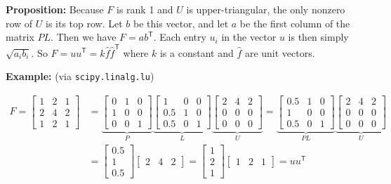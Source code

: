 \documentclass{article}
\begin{document}
\begin{enumerate}[label=(\roman*)]
\textbf{Proposition:} Because $F$ is rank 1 and $U$ is upper-triangular, the only nonzero row of $U$ is its top row. Let $b$ be this vector, and let $a$ be the first column of the matrix $PL$. Then we have $F = ab^\mathsf{T}$. Each entry $u_i$ in the vector $u$ is then simply $\sqrt{a_i b_i}$. So $F=uu^\mathsf{T}= k\hat{f}\hat{f}^\mathsf{T}$ where $k$ is a constant and $\hat{f}$ are unit vectors.

\textbf{Example:} (via \texttt{scipy.linalg.lu})

\begin{equation}
\begin{aligned}
F =
\begin{bmatrix}
1 & 2 & 1 \\
2 & 4 & 2 \\
1 & 2 & 1
\end{bmatrix}
&= 
\underbrace{\begin{bmatrix}
0 & 1 & 0 \\
1 & 0 & 0 \\
0 & 0 & 1
\end{bmatrix}}_{P}
\underbrace{\begin{bmatrix}
1 & 0 & 0 \\
0.5 & 1 & 0 \\
0.5 & 0 & 1
\end{bmatrix}}_{L}
\underbrace{\begin{bmatrix}
2 & 4 & 2 \\
0 & 0 & 0 \\
0 & 0 & 0
\end{bmatrix}}_{U}
=
\underbrace{\begin{bmatrix}
0.5 & 1 & 0 \\
1 & 0 & 0 \\
0.5 & 0 & 1
\end{bmatrix}}_{PL}
\underbrace{\begin{bmatrix}
2 & 4 & 2 \\
0 & 0 & 0 \\
0 & 0 & 0
\end{bmatrix}}_{U} \\
&=
\begin{bmatrix}
0.5 \\
1 \\
0.5 
\end{bmatrix}
\begin{bmatrix}
2 & 4 & 2 
\end{bmatrix}
=
\begin{bmatrix}
1 \\
2 \\
1 
\end{bmatrix}
\begin{bmatrix}
1 & 2 & 1 
\end{bmatrix}
= uu^\mathsf{T}
\end{aligned}
\end{equation}


\end{enumerate}
\end{document}
